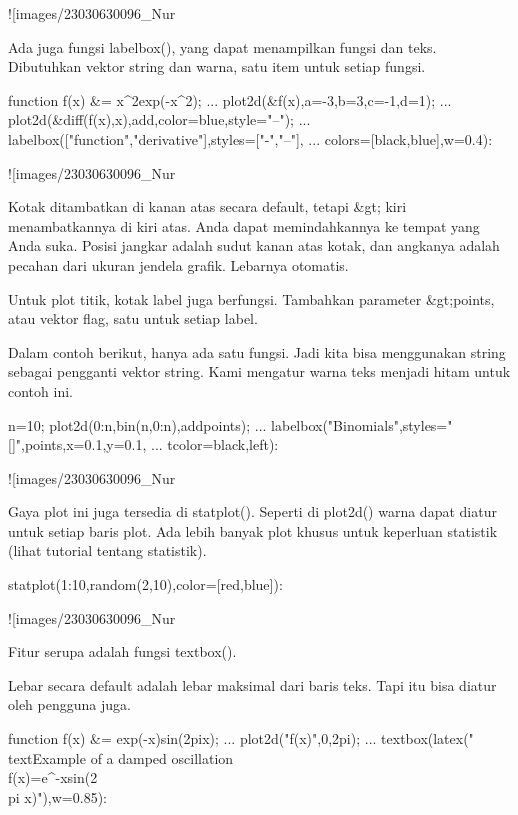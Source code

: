 \documentclass{article}
\begin{document}
![images/23030630096_Nur%

Ada juga fungsi labelbox(), yang dapat menampilkan fungsi dan teks.
Dibutuhkan vektor string dan warna, satu item untuk setiap fungsi.


\>function f(x) &= x^2\*exp(-x^2);  ...  
\>   plot2d(&f(x),a=-3,b=3,c=-1,d=1);  ...  
\>   plot2d(&diff(f(x),x),\>add,color=blue,style="--"); ...  
\>   labelbox(["function","derivative"],styles=["-","--"], ...  
\>      colors=[black,blue],w=0.4):


![images/23030630096_Nur%

Kotak ditambatkan di kanan atas secara default, tetapi &gt; kiri
menambatkannya di kiri atas. Anda dapat memindahkannya ke tempat yang
Anda suka. Posisi jangkar adalah sudut kanan atas kotak, dan angkanya
adalah pecahan dari ukuran jendela grafik. Lebarnya otomatis.


Untuk plot titik, kotak label juga berfungsi. Tambahkan parameter
&gt;points, atau vektor flag, satu untuk setiap label.


Dalam contoh berikut, hanya ada satu fungsi. Jadi kita bisa
menggunakan string sebagai pengganti vektor string. Kami mengatur
warna teks menjadi hitam untuk contoh ini.


\>n=10; plot2d(0:n,bin(n,0:n),\>addpoints); ...  
\>   labelbox("Binomials",styles="[]",\>points,x=0.1,y=0.1, ...  
\>   tcolor=black,\>left):


![images/23030630096_Nur%

Gaya plot ini juga tersedia di statplot(). Seperti di plot2d() warna
dapat diatur untuk setiap baris plot. Ada lebih banyak plot khusus
untuk keperluan statistik (lihat tutorial tentang statistik).


\>statplot(1:10,random(2,10),color=[red,blue]):


![images/23030630096_Nur%

Fitur serupa adalah fungsi textbox().


Lebar secara default adalah lebar maksimal dari baris teks. Tapi itu
bisa diatur oleh pengguna juga.


\>function f(x) &= exp(-x)\*sin(2\*pi\*x); ...  
\>   plot2d("f(x)",0,2pi); ...  
\>   textbox(latex("\\text{Example of a damped oscillation}\\ f(x)=e^{-x}sin(2\\pi x)"),w=0.85):
\end{document}
